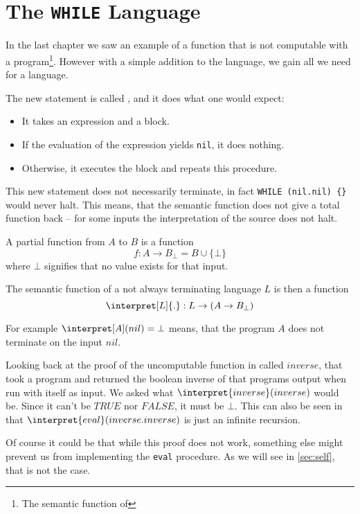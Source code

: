 \section{The {\tt WHILE} Language}
\label{sec:WHILE}
In the last chapter we saw an example of a function that is not computable 
with a \FOR program\footnote{The semantic function of \FOR}. However with a 
simple addition to the language, we gain all we need for a language.

The new statement is called \WHILE, and it does what one would expect:

\begin{itemize}
	\item It takes an expression and a block.
	\item If the evaluation of the expression yields {\tt nil}, it does nothing.
	\item Otherwise, it executes the block and repeats this procedure.
\end{itemize}

This new statement does not necessarily terminate, in fact {\tt WHILE 
(nil.nil) \{\}} would never halt. This means, that the semantic function 
does not give a total function back -- for some inputs the interpretation of 
the source does not halt.

\begin{defn}
	A partial function from $A$ to $B$ is a function 
	\[ f:A\rightarrow B_\bot = B\cup \{\bot\}\]
	where $\bot$ signifies that no value exists for that input.

	The semantic function of a not always terminating language $L$ is then a
	function 
	\[ \interpret[L]{.}: L \rightarrow (A\rightarrow B_\bot) \]

	For example $\interpret[A](nil) = \bot$ means, that the program $A$ does 
	not terminate on the input $nil$.
\end{defn}

Looking back at the proof of the uncomputable function in \FOR called
$inverse$, that took a program and returned the boolean inverse of that
programs output when run with itself as input. We asked what
$\interpret{inverse}(inverse)$ would be. Since it can't be $TRUE$ nor
$FALSE$, it must be $\bot$. This can also be seen in that
$\interpret{eval}(inverse.inverse)$ is just an infinite recursion. 

Of course it could be that while this proof does not work, something else might
prevent us from implementing the {\tt eval} procedure. As we will see in
\ref{sec:self}, that is not the case.
